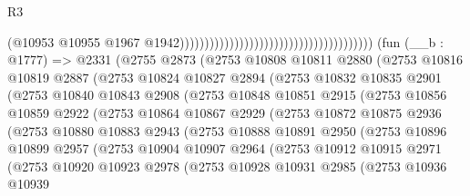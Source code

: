 \begin{lexlean}{R3}
\begin{coremodule}
                                                                                (@10953
                                                                                  @10955
                                                                                  @1967
                                                                                  @1942)))))))))))))))))))))))))))))))))))))))
    (fun (__b : @1777) =>
    @2331
      (@2755
        @2873
        (@2753
          @10808
          @10811
          @2880
          (@2753
            @10816
            @10819
            @2887
            (@2753
              @10824
              @10827
              @2894
              (@2753
                @10832
                @10835
                @2901
                (@2753
                  @10840
                  @10843
                  @2908
                  (@2753
                    @10848
                    @10851
                    @2915
                    (@2753
                      @10856
                      @10859
                      @2922
                      (@2753
                        @10864
                        @10867
                        @2929
                        (@2753
                          @10872
                          @10875
                          @2936
                          (@2753
                            @10880
                            @10883
                            @2943
                            (@2753
                              @10888
                              @10891
                              @2950
                              (@2753
                                @10896
                                @10899
                                @2957
                                (@2753
                                  @10904
                                  @10907
                                  @2964
                                  (@2753
                                    @10912
                                    @10915
                                    @2971
                                    (@2753
                                      @10920
                                      @10923
                                      @2978
                                      (@2753
                                        @10928
                                        @10931
                                        @2985
                                        (@2753
                                          @10936
                                          @10939

\end{coremodule}
\end{lexlean}
